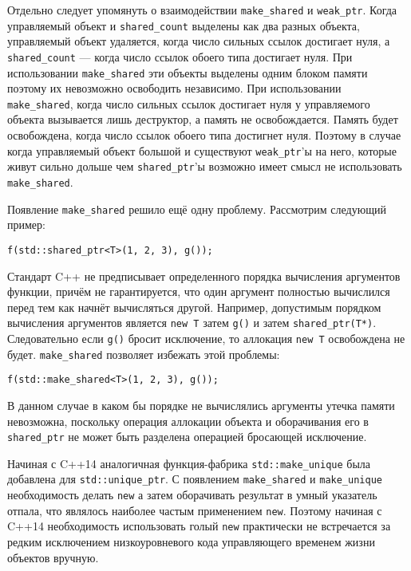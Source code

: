 Отдельно следует упомянуть о взаимодействии \texttt{make_shared} и \texttt{weak_ptr}. Когда управляемый объект и \texttt{shared_count} выделены как два разных объекта, управляемый объект удаляется, когда число сильных ссылок достигает нуля, а \texttt{shared_count} --- когда число ссылок обоего типа достигает нуля. При использовании \texttt{make_shared} эти объекты выделены одним блоком памяти поэтому их невозможно освободить независимо. При использовании \texttt{make_shared}, когда число сильных ссылок достигает нуля у управляемого объекта вызывается лишь деструктор, а память не освобождается. Память будет освобождена, когда число ссылок обоего типа достигнет нуля. Поэтому в случае когда управляемый объект большой и существуют \texttt{weak_ptr}'ы на него, которые живут сильно дольше чем \texttt{shared_ptr}'ы возможно имеет смысл не использовать \texttt{make_shared}.

Появление \texttt{make_shared} решило ещё одну проблему. Рассмотрим следующий пример:

\begin{verbatim}
f(std::shared_ptr<T>(1, 2, 3), g());
\end{verbatim}

Стандарт C++ не предписывает определенного порядка вычисления аргументов функции, причём не гарантируется, что один аргумент полностью вычислился перед тем как начнёт вычисляться другой. Например, допустимым порядком вычисления аргументов является \texttt{new T} затем \texttt{g()} и затем \texttt{shared_ptr(T*)}. Следовательно если \texttt{g()} бросит исключение, то аллокация \texttt{new T} освобождена не будет. \texttt{make_shared} позволяет избежать этой проблемы:

\begin{verbatim}
f(std::make_shared<T>(1, 2, 3), g());
\end{verbatim}

В данном случае в каком бы порядке не вычислялись аргументы утечка памяти невозможна, поскольку операция аллокации объекта и оборачивания его в \texttt{shared_ptr} не может быть разделена операцией бросающей исключение.

Начиная с C++14 аналогичная функция-фабрика \texttt{std::make_unique} была добавлена для \texttt{std::unique_ptr}. С появлением \texttt{make_shared} и \texttt{make_unique} необходимость делать \texttt{new} а затем оборачивать результат в умный указатель отпала, что являлось наиболее частым применением \texttt{new}. Поэтому начиная с C++14 необходимость использовать голый \texttt{new} практически не встречается за редким исключением низкоуровневого кода управляющего временем жизни объектов вручную.

